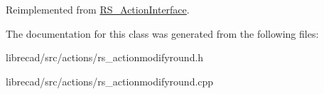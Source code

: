 Reimplemented from \hyperlink{classRS__ActionInterface_af1a8d898a8bf0521295d7c45d80e6d09}{R\-S\-\_\-\-Action\-Interface}.



The documentation for this class was generated from the following files\-:\begin{DoxyCompactItemize}
\item 
librecad/src/actions/rs\-\_\-actionmodifyround.\-h\item 
librecad/src/actions/rs\-\_\-actionmodifyround.\-cpp\end{DoxyCompactItemize}
